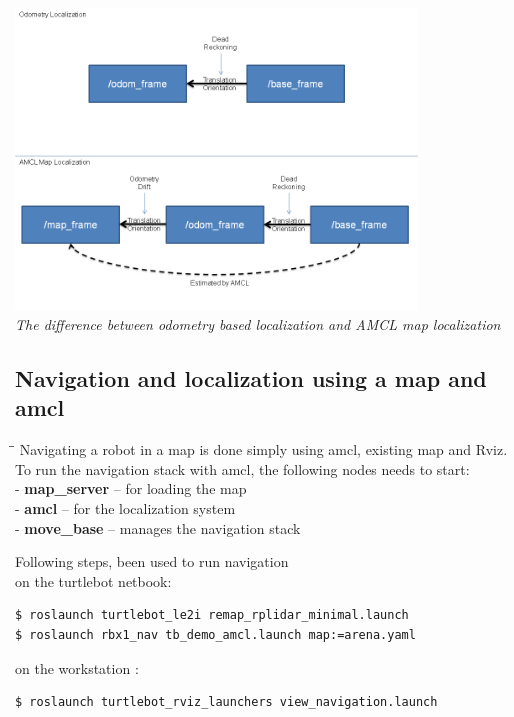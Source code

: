 \documentclass[10pt,a4paper]{article}
\begin{document}
\begin{center}
\includegraphics[width=0.8\textwidth]{images/amcl_localization.png}\\
\textit{The difference between odometry based localization and AMCL map localization}
\end{center}

\subsection{Navigation and localization using a map and amcl}

\begin{tabbing}
\hspace{1cm}\=\hspace{1cm}\=\kill
Navigating a robot in a map is done simply using amcl, existing map and Rviz. To run the navigation stack with amcl,  the following nodes needs to start: \\
\> -\textbf{ map\_server }– for loading the map\\
\> - \textbf{amcl} – for the localization system\\
\> - \textbf{move\_base} – manages the navigation stack\\
\end{tabbing}

Following steps, been used to run navigation \\
on the turtlebot netbook:
\begin{lstlisting}[frame=single]
$ roslaunch turtlebot_le2i remap_rplidar_minimal.launch
$ roslaunch rbx1_nav tb_demo_amcl.launch map:=arena.yaml
\end{lstlisting}

on the workstation : 
\begin{lstlisting}[frame=single]
$ roslaunch turtlebot_rviz_launchers view_navigation.launch
\end{lstlisting}
\end{document}
